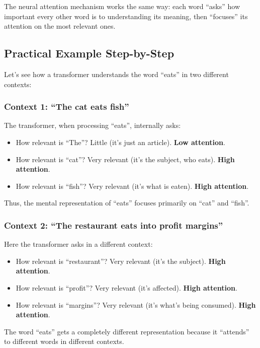 \documentclass[11pt,a4paper]{article}
\begin{document}
The neural attention mechanism works the same way: each word ``asks'' how important every other word is to understanding its meaning, then ``focuses'' its attention on the most relevant ones.

\subsection{Practical Example Step-by-Step}

Let's see how a transformer understands the word ``eats'' in two different contexts:

\subsubsection{Context 1: ``The cat eats fish''}

The transformer, when processing ``eats'', internally asks:
\begin{itemize}[leftmargin=*]
    \item How relevant is ``The''? Little (it's just an article). \textbf{Low attention}.
    \item How relevant is ``cat''? Very relevant (it's the subject, who eats). \textbf{High attention}.
    \item How relevant is ``fish''? Very relevant (it's what is eaten). \textbf{High attention}.
\end{itemize}

Thus, the mental representation of ``eats'' focuses primarily on ``cat'' and ``fish''.

\subsubsection{Context 2: ``The restaurant eats into profit margins''}

Here the transformer asks in a different context:
\begin{itemize}[leftmargin=*]
    \item How relevant is ``restaurant''? Very relevant (it's the subject). \textbf{High attention}.
    \item How relevant is ``profit''? Very relevant (it's affected). \textbf{High attention}.
    \item How relevant is ``margins''? Very relevant (it's what's being consumed). \textbf{High attention}.
\end{itemize}

The word ``eats'' gets a completely different representation because it ``attends'' to different words in different contexts.
\end{document}
